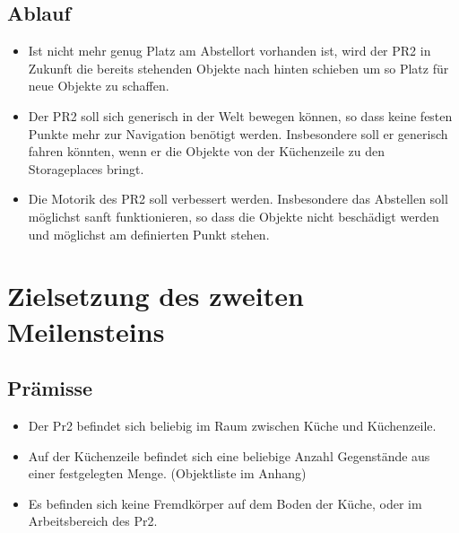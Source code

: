 \documentclass{suturo}
\begin{document}
\subsection*{Ablauf}
\begin{itemize}
\item Ist nicht mehr genug Platz am Abstellort vorhanden ist, wird der PR2 in Zukunft die bereits stehenden Objekte nach hinten schieben um so Platz für neue Objekte zu schaffen.
\item Der PR2 soll sich generisch in der Welt bewegen können, so dass keine festen Punkte mehr zur Navigation benötigt werden. Insbesondere soll er generisch fahren könnten, wenn er die Objekte von der Küchenzeile zu den Storageplaces bringt.
\item Die Motorik des PR2 soll verbessert werden. Insbesondere das Abstellen soll möglichst sanft funktionieren, so dass die Objekte nicht beschädigt werden und möglichst am definierten Punkt stehen.
\end{itemize}

\section{Zielsetzung des zweiten Meilensteins}
\subsection{Prämisse}
\begin{itemize}
\item Der Pr2 befindet sich beliebig im Raum zwischen Küche und Küchenzeile.
\item Auf der Küchenzeile befindet sich eine beliebige Anzahl Gegenstände aus einer festgelegten Menge. (Objektliste im Anhang)
\item Es befinden sich keine Fremdkörper auf dem Boden der Küche, oder im Arbeitsbereich des Pr2.
\end{itemize}
\end{document}
